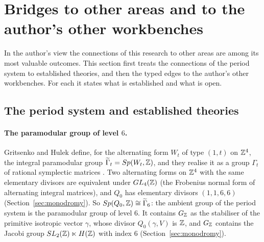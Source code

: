 \section{Bridges to other areas and to the author's other workbenches}\label{sec:overlaps}

In the author's view the connections of this research to other areas are among its most valuable outcomes. This section first treats the connections of the period system to established theories, and then the typed edges to the author's other workbenches. For each it states what is established and what is open.

\subsection{The period system and established theories}\label{ssec:theories}

\paragraph{The paramodular group of level $6$.} Gritsenko and Hulek define, for the alternating form $W_t$ of type $(1,t)$ on $\mathbb{Z}^4$, the integral paramodular group $\widetilde\Gamma_t=Sp(W_t,\mathbb{Z})$, and they realise it as a group $\Gamma_t$ of rational symplectic matrices \cite[§1]{GritsenkoHulek}. Two alternating forms on $\mathbb{Z}^4$ with the same elementary divisors are equivalent under $GL_4(\mathbb{Z})$ (the Frobenius normal form of alternating integral matrices), and $Q_0$ has elementary divisors $(1,1,6,6)$ (Section~\ref{sec:monodromy}). So $Sp(Q_0,\mathbb{Z})\cong\widetilde\Gamma_6$: the ambient group of the period system is the paramodular group of level $6$. It contains $G_{\mathbb{Z}}$ as the stabiliser of the primitive isotropic vector $\gamma$, whose divisor $Q_0(\gamma,V)$ is $\mathbb{Z}$, and $G_{\mathbb{Z}}$ contains the Jacobi group $SL_2(\mathbb{Z})\ltimes H(\mathbb{Z})$ with index $6$ (Section~\ref{sec:monodromy}).

